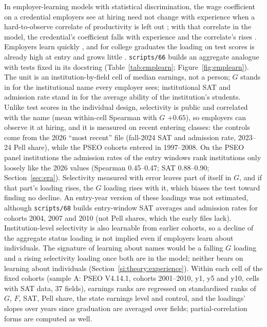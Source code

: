 \documentclass[11pt]{article}
\newcommand{\scr}[1]{\texttt{scripts/#1}}
\begin{document}
In employer-learning models with statistical discrimination, the wage coefficient on a credential employers see at
hiring need not change with experience when a hard-to-observe correlate of productivity is left out
\citep{farber1996learning}; with that correlate in the model, the credential's coefficient falls with experience and
the correlate's rises \citep{altonji2001employer}. Employers learn quickly \citep{lange2007speed}, and for college
graduates the loading on test scores is already high at entry and grows little \citep{arcidiacono2010beyond}.
\scr{66} builds an aggregate analogue with tests fixed in its docstring (Table~\ref{tab:emplearn};
Figure~\ref{fig:emplearn}). The unit is an institution-by-field cell of median earnings, not a person; $G$ stands in
for the institutional name every employer sees; institutional SAT and admission rate stand in for the average
ability of the institution's students. Unlike test scores in the individual design, selectivity is public and
correlated with the name (mean within-cell Spearman with $G$ $+0.65$), so employers can observe it at hiring, and
it is measured on recent entering classes: the controls come from the 2026 ``most recent'' file (fall-2024 SAT and
admission rate, 2023--24 Pell share), while the PSEO cohorts entered in 1997--2008. On the PSEO panel institutions the
admission rates of the entry windows rank institutions only loosely like the 2026 values (Spearman 0.45--0.47; SAT
0.88--0.90; Section~\ref{sec:era}). Selectivity measured with error leaves part of itself in $G$, and if that part's
loading rises, the $G$ loading rises with it, which biases the test toward finding no decline. An entry-year
version of these loadings was not estimated, although \scr{68} builds entry-window SAT averages and admission
rates for cohorts 2004, 2007 and 2010 (not Pell shares, which the early files lack). Institution-level selectivity is also learnable from earlier cohorts, so
a decline of the aggregate status loading is not implied even if employers learn about individuals. The signature
of learning about names would be a falling $G$ loading and a rising selectivity loading once both are in the model;
neither bears on learning about individuals (Section~\ref{si:theory:experience}). Within each cell of the fixed cohorts (sample A: PSEO V4.14.1,
cohorts 2001--2010, y1, y5 and y10, cells with SAT data, 37 fields), earnings ranks are regressed on standardised ranks
of $G$, $F$, SAT, Pell share, the state earnings level and control, and the loadings' slopes over years since
graduation are averaged over fields; partial-correlation forms are computed as well.
\end{document}
